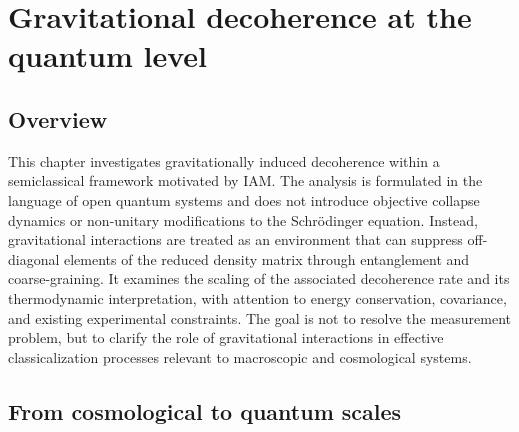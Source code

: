 
\chapter{Gravitational decoherence at the quantum level}\label{ch:gravdec}

\section*{Overview}
This chapter investigates gravitationally induced decoherence within a semiclassical framework motivated by IAM. The analysis is formulated in the language
of open quantum systems and does not introduce objective collapse dynamics or non-unitary modifications to the Schr\"odinger equation. Instead, gravitational
interactions are treated as an environment that can suppress off-diagonal elements of the reduced density matrix through entanglement and coarse-graining.
It examines the scaling of the associated decoherence rate and its thermodynamic interpretation, with attention to energy conservation, covariance, and
existing experimental constraints. The goal is not to resolve the measurement problem, but to clarify the role of gravitational interactions in effective
classicalization processes relevant to macroscopic and cosmological systems.

\section{From cosmological to quantum scales}\label{sec:gd_scales}

